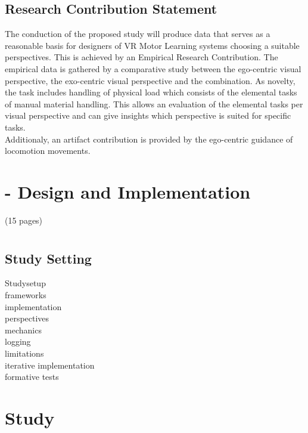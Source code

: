 \subsection{Research Contribution Statement}
\label{delimination_contribution}
The conduction of the proposed study will produce data that serves as a reasonable basis for designers of VR Motor Learning systems choosing a suitable perspectives. This is achieved by an Empirical Research Contribution. The empirical data is gathered by a comparative study between the ego-centric visual perspective, the exo-centric visual perspective and the combination. As novelty, the task includes handling of physical load which consists of the elemental tasks of manual material handling. This allows an evaluation of the elemental tasks per visual perspective and can give insights which perspective is suited for specific tasks.\\
Additionaly, an artifact contribution is provided by the ego-centric guidance of locomotion movements.
\section{\exgo - Design and Implementation}
(15 pages)
\section{\exgo}
\label{section:system}
\subsection{Study Setting}
Studysetup\\
frameworks\\
implementation\\
perspectives\\
mechanics\\
logging\\
limitations\\
iterative implementation\\
formative tests\\
\section{Study}
\label{section:study}

